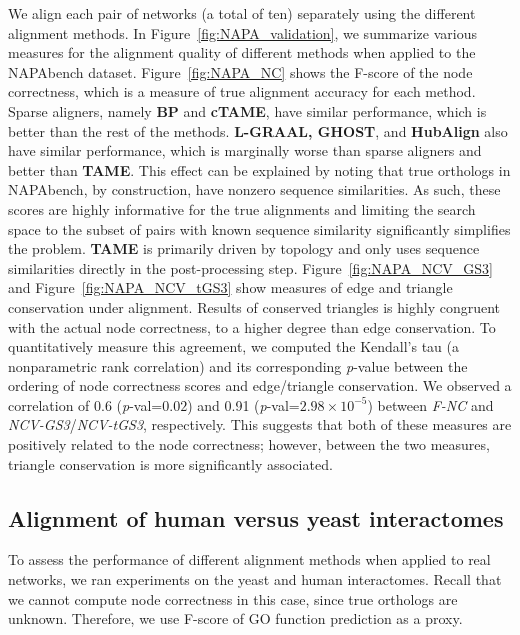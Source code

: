 \documentclass[10pt, journal, compsoc, final]{IEEEtran}
\begin{document}
We align each pair of networks (a total of ten) separately using the different alignment methods. 
In Figure~\ref{fig:NAPA_validation}, we summarize various measures for the alignment quality of different methods when applied to the NAPAbench dataset. Figure~\ref{fig:NAPA_NC} shows the F-score of the node correctness, which is a measure of true alignment accuracy for each method. Sparse aligners, namely \textbf{BP} and \textbf{cTAME}, have similar performance, which is better than
the rest of the methods. \textbf{L-GRAAL, GHOST}, and \textbf{HubAlign} also have similar performance, which is marginally worse than sparse aligners and better than \textbf{TAME}. This effect can be explained by noting that true orthologs in NAPAbench, by construction, have nonzero sequence similarities. As such, these scores are highly informative for the true alignments and limiting the search space to the subset of pairs with known sequence similarity significantly simplifies the problem. \textbf{TAME} is primarily driven by topology and only uses sequence similarities directly in the post-processing step. Figure~\ref{fig:NAPA_NCV_GS3} and Figure~\ref{fig:NAPA_NCV_tGS3} show  measures of edge and triangle conservation under alignment. Results of conserved triangles is highly congruent with the actual node correctness, to a higher degree than edge conservation. To quantitatively measure this agreement, we computed the Kendall's tau (a nonparametric rank correlation) and its corresponding \emph{p}-value between the ordering of node correctness scores and edge/triangle conservation. We observed a correlation of 0.6 (\emph{p}-val=$0.02$) and 0.91 (\emph{p}-val=$2.98 \times 10^{-5}$) between \textit{F-NC} and \textit{NCV-GS3}/\textit{NCV-tGS3}, respectively. This suggests that both of these measures are positively related to the node correctness; however, between the two measures, triangle conservation is more significantly associated.




\subsection{Alignment of human versus yeast interactomes}

To assess the performance of different alignment methods when applied to real networks, we 
ran experiments on the yeast and human interactomes.  Recall that we cannot compute node correctness in this
case, since true orthologs are unknown. Therefore, we use F-score of GO function prediction as a proxy. 
\end{document}
